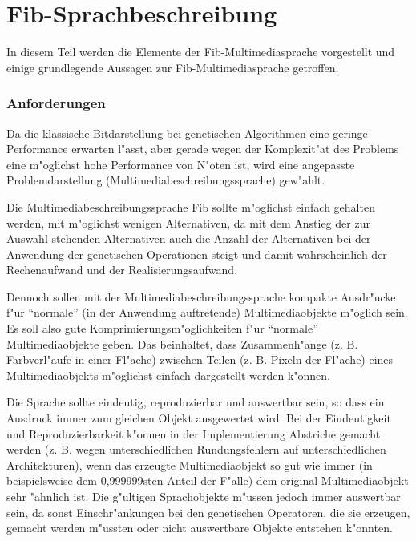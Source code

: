 %
%
%
%

\graphicspath{{./material_sprachbeschreibung/}}
\graphicspath{{./material_sprachbeschreibung/}{../material_sprachbeschreibung}}


\newpage
\part{Fib-Sprachbeschreibung}
\label{partFibLanguage}

In diesem Teil werden die Elemente der Fib-Multimediasprache vorgestellt und einige grundlegende Aussagen zur Fib-Multimediasprache getroffen.


\section{Anforderungen}
\label{secFibLanguageRequirements}

Da die klassische Bitdarstellung bei genetischen Algorithmen eine geringe Performance erwarten l"asst,  aber gerade wegen der Komplexit"at des Problems eine m"oglichst hohe Performance von N"oten ist, wird eine angepasste Problemdarstellung (Multimediabeschreibungssprache) gew"ahlt.

Die Multimediabeschreibungssprache Fib sollte m"oglichst einfach gehalten werden, mit m"oglichst wenigen Alternativen, da mit dem Anstieg der zur Auswahl stehenden Alternativen auch die Anzahl der Alternativen bei der Anwendung der genetischen Operationen steigt und damit wahrscheinlich der Rechenaufwand und der Realisierungsaufwand.

Dennoch sollen mit der Multimediabeschreibungssprache kompakte Ausdr"ucke f"ur ``normale'' (in der Anwendung auftretende) Multimediaobjekte m"oglich sein. Es soll also gute Komprimierungsm"oglichkeiten f"ur ``normale'' Multimediaobjekte geben. Das beinhaltet, dass Zusammenh"ange (z. B. Farbverl"aufe in einer Fl"ache) zwischen Teilen (z. B. Pixeln der Fl"ache) eines Multimediaobjekts m"oglichst einfach dargestellt werden k"onnen.

Die Sprache sollte eindeutig, reproduzierbar und auswertbar sein, so dass ein Ausdruck immer zum gleichen Objekt ausgewertet wird. Bei der Eindeutigkeit und Reproduzierbarkeit k"onnen in der Implementierung Abstriche gemacht werden (z. B. wegen unterschiedlichen Rundungsfehlern auf unterschiedlichen Architekturen), wenn das erzeugte Multimediaobjekt so gut wie immer (in beispielsweise dem 0,999999sten Anteil der F"alle) dem original Multimediaobjekt sehr "ahnlich ist. Die g"ultigen Sprachobjekte m"ussen jedoch immer auswertbar sein, da sonst Einschr"ankungen bei den genetischen Operatoren, die sie erzeugen, gemacht werden m"ussten oder nicht auswertbare Objekte entstehen k"onnten.

